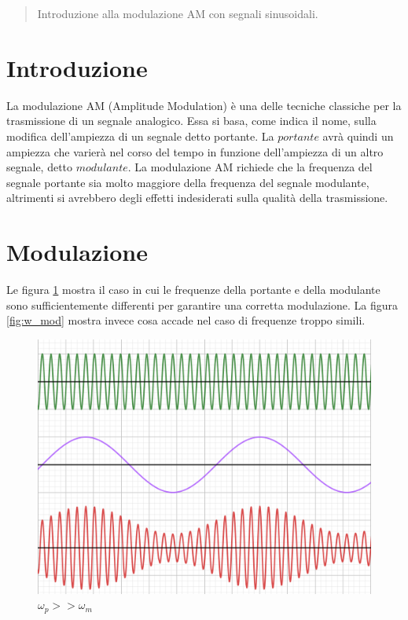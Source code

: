 \documentclass[11pt,a4paper]{article}
\author{Luca Di Liello \\
  Universit\`a degli studi di Trento / Professore temporaneo presso IIS Galileo Galilei \\
  {\tt luca.diliello@alumni.unitn.it} \\
  last edit: 23/11/2018 - 23:13
}
\begin{document}
\maketitle
\begin{abstract}
  Introduzione alla modulazione AM con segnali sinusoidali.
 \end{abstract}

\section{Introduzione}

La modulazione AM (Amplitude Modulation) è una delle tecniche classiche per la trasmissione di un segnale analogico. Essa si basa, come indica il nome, sulla modifica dell'ampiezza di un segnale detto portante. La $portante$ avrà quindi un ampiezza che varierà nel corso del tempo in funzione dell'ampiezza di un altro segnale, detto $modulante$. La modulazione AM richiede che la frequenza del segnale portante sia molto maggiore della frequenza del segnale modulante, altrimenti si avrebbero degli effetti indesiderati sulla qualità della trasmissione. 

\section{Modulazione}

Le figura \ref{fig:c_mod} mostra il caso in cui le frequenze della portante e della modulante sono sufficientemente differenti per garantire una corretta modulazione. La figura \ref{fig:w_mod} mostra invece cosa accade nel caso di frequenze troppo simili. 

\begin{figure}
  \includegraphics[width=\linewidth]{images/correct_mod.png}
  \caption{$\omega_p >> \omega_m$}
  \label{fig:c_mod}
\end{figure}
\end{document}
